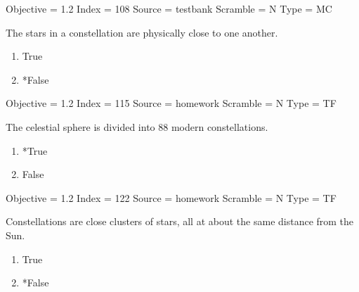 \documentclass[11pt]{article}
\begin{document}
\begin{enumerate}
\begin{minipage}{\textwidth}
\begin{minipage}{\textwidth}
Objective = 1.2
Index = 108
Source = testbank
Scramble = N
Type = MC
\end{minipage}
\end{minipage}
\vskip 0.20in

\begin{minipage}{\textwidth}
\begin{minipage}{\textwidth}
\item The stars in a constellation are physically close to one another.
\begin{multicols}{3}
\begin{enumerate} 
\setlength{\itemsep}{1pt} 
\setlength{\parskip}{0pt} 
\setlength{\parsep}{0pt}
\setlength{\multicolsep}{1pt} 
\item True
\item *False
\end{enumerate} 
\vfill 
\end{multicols}

Objective = 1.2
Index = 115
Source = homework
Scramble = N
Type = TF
\end{minipage}
\end{minipage}
\vskip 0.20in

\begin{minipage}{\textwidth}
\begin{minipage}{\textwidth}
\item The celestial sphere is divided into 88 modern constellations.
\begin{multicols}{3}
\begin{enumerate} 
\setlength{\itemsep}{1pt} 
\setlength{\parskip}{0pt} 
\setlength{\parsep}{0pt}
\setlength{\multicolsep}{1pt} 
\item *True
\item False
\end{enumerate} 
\vfill 
\end{multicols}

Objective = 1.2
Index = 122
Source = homework
Scramble = N
Type = TF
\end{minipage}
\end{minipage}
\vskip 0.20in

\begin{minipage}{\textwidth}
\begin{minipage}{\textwidth}
\item Constellations are close clusters of stars, all at about the same distance from the Sun.
\begin{multicols}{3}
\begin{enumerate} 
\setlength{\itemsep}{1pt} 
\setlength{\parskip}{0pt} 
\setlength{\parsep}{0pt}
\setlength{\multicolsep}{1pt} 
\item True
\item *False
\end{enumerate} 
\vfill 
\end{multicols}


\end{minipage}
\end{minipage}
\end{enumerate}
\end{document}
